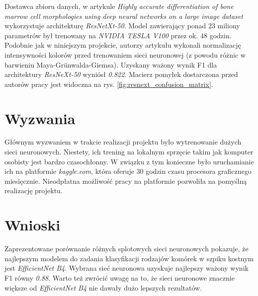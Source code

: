 Dostawca zbioru danych, w artykule \textit{Highly accurate differentiation of bone marrow cell morphologies using deep neural networks on a large image dataset} \cite{resnext} wykorzystuje architekturę \textit{ResNetXt-50}.
Model zawierający ponad 23 miliony parametrów był trenowany na \textit{NVIDIA TESLA V100} przez ok. 48 godzin.
Podobnie jak w niniejszym projekcie, autorzy artykułu wykonali normalizację intensywności kolorów przed trenowaniem sieci neuronowej (z powodu różnic w barwieniu Maya-Grünwalda-Giemsa).
Uzyskany ważony wynik F1 dla architektury \textit{ResNeXt-50} wyniósł \textit{0.822}.
Macierz pomyłek dostarczona przed autorów pracy jest widoczna na rys. \ref{fig:resnext_confusion_matrix}.


\section{Wyzwania}

Głównym wyzwaniem w trakcie realizacji projektu było wytrenowanie dużych sieci neuronowych.
Niestety, ich trening na lokalnym sprzęcie takim jak komputer osobisty jest bardzo czasochłonny.
W związku z tym konieczne było uruchamianie ich na platformie \textit{kaggle.com}, która oferuje 30 godzin czasu procesora graficznego miesięcznie.
Nieodpłatna możliwość pracy na platformie pozwoliła na pomyślną realizację projektu.


\section{Wnioski}

Zaprezentowane porównanie różnych splotowych sieci neuronowych pokazuje, że najlepszym modelem do zadania klasyfikacji rodzajów komórek w szpiku kostnym jest \textit{EfficientNet B4}.
Wybrana sieć neuronowa uzyskuje najlepszy ważony wynik F1 równy \textit{0.88}.
Warto też zwrócić uwagę na to, że sieci neuronowe znacznie większe od \textit{EfficientNet B4} nie dawały dużo lepszych rezultatów.

